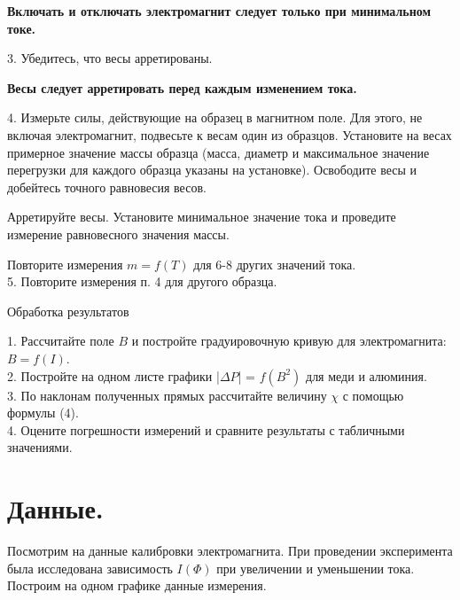 \begin{center}
    \textbf{Включать и отключать электромагнит следует только при минимальном токе.}
\end{center}
3.	Убедитесь, что весы арретированы.
\begin{center}
    \textbf{Весы следует арретировать перед каждым изменением тока.}
\end{center}
4.	Измерьте силы, действующие на образец в магнитном поле. Для этого, не включая электромагнит, подвесьте к весам один из образцов. Установите на весах примерное значение массы образца (масса, диаметр и максимальное значение перегрузки для каждого образца указаны на установке). Освободите весы и добейтесь точного равновесия весов.

Арретируйте весы. Установите минимальное значение тока и проведите измерение равновесного значения массы.

Повторите измерения $m = f(T)$ для 6-8 других значений тока.\\
5.	Повторите измерения п. 4 для другого образца.

\begin{center}
Обработка результатов
\end{center}
1. Рассчитайте поле $B$ и постройте градуировочную кривую для электромагнита: $B = f(I)$.\\
2. Постройте на одном листе графики |$\Delta{P}$| = $f(B^2)$ для меди и алюминия.\\
3. По наклонам полученных прямых рассчитайте величину $\chi$ с помощью формулы (4).\\
4. Оцените погрешности измерений и сравните результаты с табличными значениями.

\section{\label{sec:level1}Данные.}

Посмотрим на данные калибровки электромагнита. При проведении эксперимента была исследована зависимость $I(\Phi)$ при увеличении и уменьшении тока. Построим на одном графике данные измерения.

